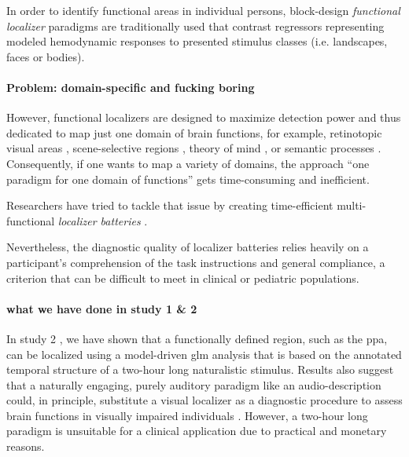 In order to identify functional areas in individual persons, block-design
\textit{functional localizer} paradigms are traditionally used that contrast
regressors representing modeled hemodynamic responses to presented stimulus
classes (i.e. landscapes, faces or bodies).



\paragraph{Problem: domain-specific and fucking boring}

However, functional localizers are designed to maximize detection power and thus
dedicated to map just one domain of brain functions, for example, retinotopic
visual areas \citep{wang2015probabilistic}, scene-selective regions
\citep{stigliani2015temporal}, theory of mind \citep{spunt2014validating}, or
semantic processes \citep{fernandez2001language}.
Consequently, if one wants to map a variety of domains, the approach ``one
paradigm for one domain of functions'' gets time-consuming and inefficient.


Researchers have tried to tackle that issue by creating time-efficient
multi-functional \textit{localizer batteries} \citep[e.g.,][]{barch2013function,
drobyshevsky2006rapid, pinel2007fast}.

Nevertheless, the diagnostic quality of localizer batteries relies heavily on
a participant's comprehension of the task instructions and general compliance,
a criterion that can be difficult to meet in clinical or pediatric populations.



\paragraph{what we have done in study 1 \& 2}

%
In study 2 \citep{haeusler2022processing}, we have shown that a functionally
defined region, such as the \ac{ppa}, can be localized using a model-driven
\ac{glm} analysis that is based on the annotated temporal structure of a
two-hour long naturalistic stimulus.
%
Results also suggest that a naturally engaging, purely auditory paradigm like an
audio-description could, in principle, substitute a visual localizer as a
diagnostic procedure to assess brain functions in visually impaired individuals
\citep{haeusler2022processing}.
%
However, a two-hour long paradigm is unsuitable for a clinical application due
to practical and monetary reasons.



